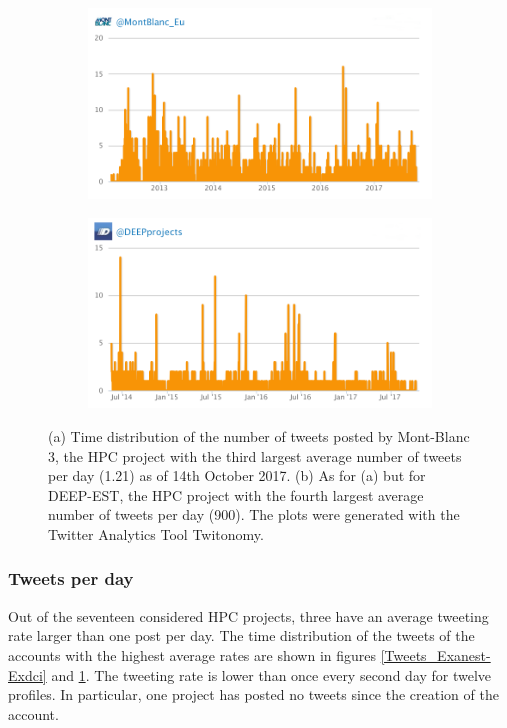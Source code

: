 \begin{figure}
 \centering
 \begin{subfigure}[t]{0.9\textwidth}
   \includegraphics[width=1\linewidth]{Images/Tweets_Montblanc.png}
   \caption{} 
 \end{subfigure}

 \begin{subfigure}[t]{0.9\textwidth}
   \includegraphics[width=1\linewidth]{Images/Tweets_Deepest.png}
   \caption{}
 \end{subfigure}
 \caption{(a) Time distribution of the number of tweets posted by Mont-Blanc 3, the HPC project with the third largest average number of tweets per day (1.21) as of 14th October 2017. (b) As for (a) but for DEEP-EST, the HPC project with the fourth largest average number of tweets per day (900). The plots were generated with the Twitter Analytics Tool Twitonomy.} 
 \label{Tweets_Montblanc-Deepest}
\end{figure}

\subsubsection{Tweets per day}
Out of the seventeen considered HPC projects, three have an average tweeting rate larger than one post per day. The time distribution of the tweets of the accounts with the highest average rates are shown in figures \ref{Tweets_Exanest-Exdci} and \ref{Tweets_Montblanc-Deepest}. The tweeting rate is lower than once every second day for twelve profiles. In particular, one project has posted no tweets since the creation of the account. 

